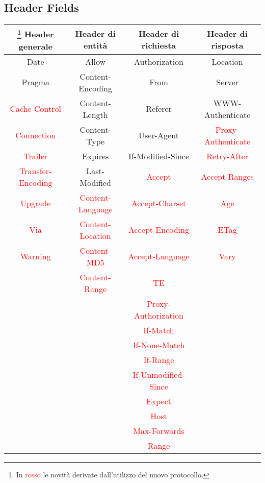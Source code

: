 \documentclass[a4paper,11pt]{article}
\begin{document}
\subsection{Header Fields}
\begin{center}
    \begin{longtable}{c|c|c|c}\footnote{In \textcolor{red}{rosso} le novità derivate dall’utilizzo del nuovo protocollo.}
        \textbf{Header generale} & \textbf{Header di entità} & \textbf{Header di richiesta} & \textbf{Header di risposta}\\
        \hline
        Date & Allow & Authorization & Location\\
        \hline
        Pragma & Content-Encoding & From & Server\\
        \hline
        \textcolor{red}{Cache-Control} & Content-Length & Referer & WWW-Authenticate\\
        \hline
        \textcolor{red}{Connection} & Content-Type & User-Agent & \textcolor{red}{Proxy-Authenticate}\\
        \hline
        \textcolor{red}{Trailer} & Expires & If-Modified-Since & \textcolor{red}{Retry-After}\\
        \hline
        \textcolor{red}{Transfer-Encoding} & Last-Modified & \textcolor{red}{Accept} & \textcolor{red}{Accept-Ranges}\\
        \hline
        \textcolor{red}{Upgrade} & \textcolor{red}{Content-Language} & \textcolor{red}{Accept-Charset} & \textcolor{red}{Age}\\
        \hline
        \textcolor{red}{Via} & \textcolor{red}{Content-Location} & \textcolor{red}{Accept-Encoding} & \textcolor{red}{ETag}\\
        \hline
        \textcolor{red}{Warning} & \textcolor{red}{Content-MD5} & \textcolor{red}{Accept-Language} & \textcolor{red}{Vary}\\
        \hline
        & \textcolor{red}{Content-Range} & \textcolor{red}{TE} &\\
        \hline
        & & \textcolor{red}{Proxy-Authorization} &\\
        \hline
        & & \textcolor{red}{If-Match} &\\
        \hline
        & & \textcolor{red}{If-None-Match} &\\
        \hline
        & & \textcolor{red}{If-Range} &\\
        \hline
        & & \textcolor{red}{If-Unmodified-Since} &\\
        \hline
        & & \textcolor{red}{Expect} &\\
        \hline
        & & \textcolor{red}{Host} &\\
        \hline
        & & \textcolor{red}{Max-Forwards} &\\
        \hline
        & & \textcolor{red}{Range} &
    \end{longtable}
\end{center}
\end{document}
